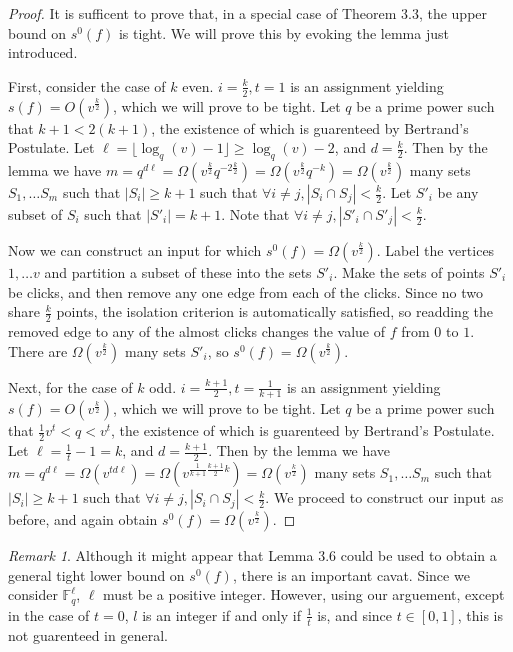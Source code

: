 \documentclass[psamsfonts]{amsart}
\theoremstyle{definition}
\theoremstyle{remark}
\newtheorem{rem}[theorem]{Remark}
\numberwithin{equation}{section}
\begin{document}
	\begin{proof}
		It is sufficent to prove that, in a special case of Theorem 3.3, the upper bound on $s^0(f)$ is tight. We will prove this by evoking the lemma just introduced.

		First, consider the case of $k$ even. $i=\frac{k}{2},t=1$ is an assignment yielding $s(f)=O(v^\frac{k}{2})$, which we will prove to be tight.  Let $q$ be a prime power such that $k+1<2(k+1)$, the existence of which is guarenteed by Bertrand's Postulate. Let $\ell=\lfloor\log_q(v)-1\rfloor\geq\log_q(v)-2$, and $d=\frac{k}{2}$. Then by the lemma we have $m=q^{d\ell}=\Omega(v^\frac{k}{2}q^{-2\frac{k}{2}})=\Omega(v^\frac{k}{2}q^{-k})=\Omega(v^\frac{k}{2})$ many sets $S_1,\ldots S_m$ such that $|S_i|\geq k+1$ such that $\forall i\neq j,|S_i\cap S_j|<\frac{k}{2}$. Let $S'_i$ be any subset of $S_i$ such that $|S'_i|=k+1$. Note that $\forall i\neq j,|S'_i\cap S'_j|<\frac{k}{2}$.

		Now we can construct an input for which $s^0(f)=\Omega(v^\frac{k}{2})$. Label the vertices $1,\ldots v$ and partition a subset of these into the sets $S'_i$. Make the sets of points $S'_i$ be clicks, and then remove any one edge from each of the clicks. Since no two share $\frac{k}{2}$ points, the isolation criterion is automatically satisfied, so readding the removed edge to any of the almost clicks changes the value of $f$ from $0$ to $1$. There are $\Omega(v^\frac{k}{2})$ many sets $S'_i$, so $s^0(f)=\Omega(v^\frac{k}{2})$.

		Next, for the case of $k$ odd.  $i=\frac{k+1}{2},t=\frac{1}{k+1}$ is an assignment yielding $s(f)=O(v^\frac{k}{2})$, which we will prove to be tight. Let $q$ be a prime power such that $\frac{1}{2}v^t<q<v^t$, the existence of which is guarenteed by Bertrand's Postulate.  Let $\ell=\frac{1}{t}-1=k$, and $d=\frac{k+1}{2}$. Then by the lemma we have $m=q^{d\ell}=\Omega(v^{td\ell})=\Omega(v^{\frac{1}{k+1}\frac{k+1}{2}k})=\Omega(v^\frac{k}{2})$ many sets $S_1,\ldots S_m$ such that $|S_i|\geq k+1$ such that $\forall i\neq j,|S_i\cap S_j|<\frac{k}{2}$. We proceed to construct our input as before, and again obtain $s^0(f)=\Omega(v^\frac{k}{2})$.
	\end{proof}

	\begin{rem}
		Although it might appear that Lemma 3.6 could be used to obtain a general tight lower bound on $s^0(f)$, there is an important cavat. Since we consider $\mathbb{F}^\ell_q$, $\ell$ must be a positive integer. However, using our arguement, except in the case of $t=0$, $l$ is an integer if and only if $\frac{1}{t}$ is, and since $t\in[0,1]$, this is not guarenteed in general.
	\end{rem}
\end{document}
